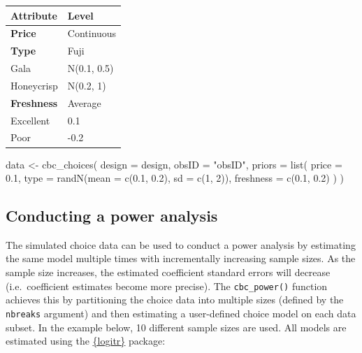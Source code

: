 \documentclass[
  12pt,
]{article}
\newenvironment{Shaded}{\begin{snugshade}}{\end{snugshade}}
\newcommand{\AttributeTok}[1]{\textcolor[rgb]{0.77,0.63,0.00}{#1}}
\newcommand{\DecValTok}[1]{\textcolor[rgb]{0.00,0.00,0.81}{#1}}
\newcommand{\FloatTok}[1]{\textcolor[rgb]{0.00,0.00,0.81}{#1}}
\newcommand{\FunctionTok}[1]{\textcolor[rgb]{0.00,0.00,0.00}{#1}}
\newcommand{\NormalTok}[1]{#1}
\newcommand{\OtherTok}[1]{\textcolor[rgb]{0.56,0.35,0.01}{#1}}
\newcommand{\StringTok}[1]{\textcolor[rgb]{0.31,0.60,0.02}{#1}}
\begin{document}
\begin{longtable}[]{@{}ll@{}}
\toprule
Attribute & Level \\
\midrule
\endhead
\textbf{Price} & Continuous \\
\textbf{Type} & Fuji \\
Gala & N(0.1, 0.5) \\
Honeycrisp & N(0.2, 1) \\
\textbf{Freshness} & Average \\
Excellent & 0.1 \\
Poor & -0.2 \\
\bottomrule
\end{longtable}

\begin{Shaded}
\begin{Highlighting}[]
\NormalTok{data }\OtherTok{\textless{}{-}} \FunctionTok{cbc\_choices}\NormalTok{(}
  \AttributeTok{design =}\NormalTok{ design,}
  \AttributeTok{obsID =} \StringTok{"obsID"}\NormalTok{,}
  \AttributeTok{priors =} \FunctionTok{list}\NormalTok{(}
    \AttributeTok{price =} \FloatTok{0.1}\NormalTok{,}
    \AttributeTok{type =} \FunctionTok{randN}\NormalTok{(}\AttributeTok{mean =} \FunctionTok{c}\NormalTok{(}\FloatTok{0.1}\NormalTok{, }\FloatTok{0.2}\NormalTok{), }\AttributeTok{sd =} \FunctionTok{c}\NormalTok{(}\DecValTok{1}\NormalTok{, }\DecValTok{2}\NormalTok{)),}
    \AttributeTok{freshness =} \FunctionTok{c}\NormalTok{(}\FloatTok{0.1}\NormalTok{, }\FloatTok{0.2}\NormalTok{)}
\NormalTok{  )}
\NormalTok{)}
\end{Highlighting}
\end{Shaded}

\hypertarget{conducting-a-power-analysis}{%
\subsection{Conducting a power
analysis}\label{conducting-a-power-analysis}}

The simulated choice data can be used to conduct a power analysis by
estimating the same model multiple times with incrementally increasing
sample sizes. As the sample size increases, the estimated coefficient
standard errors will decrease (i.e.~coefficient estimates become more
precise). The \texttt{cbc\_power()} function achieves this by
partitioning the choice data into multiple sizes (defined by the
\texttt{nbreaks} argument) and then estimating a user-defined choice
model on each data subset. In the example below, 10 different sample
sizes are used. All models are estimated using the
\href{https://jhelvy.github.io/logitr}{\{logitr\}} package:
\end{document}
